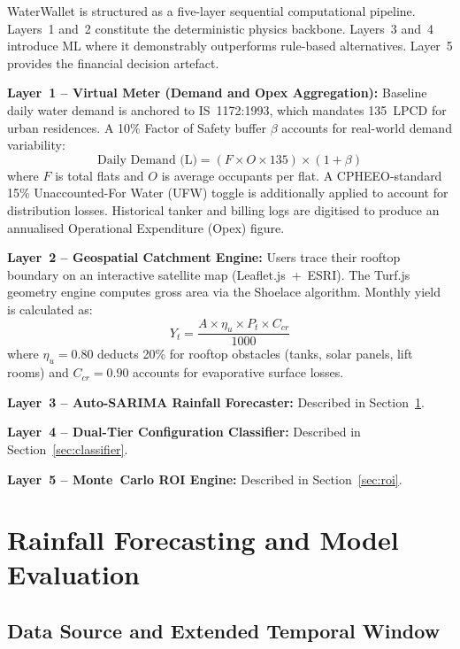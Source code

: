 \documentclass[conference]{IEEEtran}
\begin{document}
WaterWallet is structured as a five-layer sequential computational pipeline.
Layers~1 and~2 constitute the deterministic physics backbone. Layers~3 and~4
introduce ML where it demonstrably outperforms rule-based alternatives.
Layer~5 provides the financial decision artefact.

\textbf{Layer~1 -- Virtual Meter (Demand and Opex Aggregation):}
Baseline daily water demand is anchored to IS~1172:1993, which
mandates 135~LPCD for urban residences. A 10\% Factor of Safety buffer
$\beta$ accounts for real-world demand variability:
\begin{equation}
  \text{Daily Demand (L)} = (F \times O \times 135) \times (1 + \beta)
  \label{eq:demand}
\end{equation}
where $F$ is total flats and $O$ is average occupants per flat. A
CPHEEO-standard 15\% Unaccounted-For Water (UFW) toggle is additionally
applied to account for distribution losses. Historical tanker and billing
logs are digitised to produce an annualised Operational Expenditure (Opex)
figure.

\textbf{Layer~2 -- Geospatial Catchment Engine:}
Users trace their rooftop boundary on an interactive satellite map
(Leaflet.js~+~ESRI). The Turf.js geometry engine computes gross area via
the Shoelace algorithm. Monthly yield is calculated as:
\begin{equation}
  Y_t = \frac{A \times \eta_u \times P_t \times C_{cr}}{1000}
  \label{eq:yield}
\end{equation}
where $\eta_u = 0.80$ deducts 20\% for rooftop obstacles (tanks, solar
panels, lift rooms) and $C_{cr} = 0.90$ accounts for evaporative surface
losses.

\textbf{Layer~3 -- Auto-SARIMA Rainfall Forecaster:}
Described in Section~\ref{sec:rainfall}.

\textbf{Layer~4 -- Dual-Tier Configuration Classifier:}
Described in Section~\ref{sec:classifier}.

\textbf{Layer~5 -- Monte~Carlo ROI Engine:}
Described in Section~\ref{sec:roi}.

\section{Rainfall Forecasting and Model Evaluation}
\label{sec:rainfall}

\subsection{Data Source and Extended Temporal Window}
\end{document}
